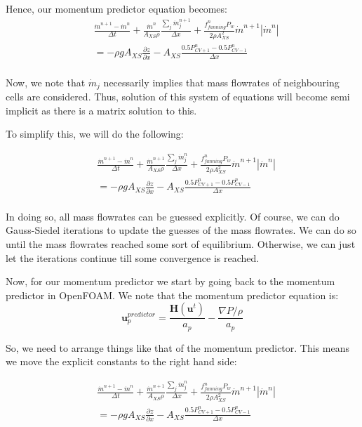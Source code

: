 \documentclass[masters]{ucbthesis}
\renewcommand{\_}{\kern-1.5pt\textunderscore\kern-1.5pt}
\begin{document}
Hence, our momentum predictor equation becomes:
\begin{align*} 
	& \frac{\dot{m}^{n+1} - \dot{m}^n}{\Delta t}
	+ \frac{\dot{m}^n}{A_{XS} \rho} \frac{\sum_j \dot{m}_j^{n+1}}{\Delta x} 
	+\frac{f_{fanning}^n P_w}{2 \rho A_{XS}^2} \dot{m}^{n+1} |\dot{m}^n| \\
	& =
	- \rho g A_{XS} \frac{\partial z}{\partial x}
	- A_{XS} \frac{0.5 P^{n}_{CV+1}-0.5P^n_{CV-1}}{\Delta x} \\
\end{align*}

Now, we note that $\dot{m}_j$ necessarily implies that mass flowrates 
of neighbouring cells are considered. Thus, solution of this system 
of equations will become semi implicit as there is a matrix solution to 
this.

To simplify this, we will do the following:

\begin{align*}
	& \frac{\dot{m}^{n+1} - \dot{m}^n}{\Delta t}
	+ \frac{\dot{m}^{n+1}}{A_{XS} \rho} \frac{\sum_j \dot{m}_j^{n}}{\Delta x} 
	+\frac{f_{fanning}^n P_w}{2 \rho A_{XS}^2} \dot{m}^{n+1} |\dot{m}^n|  \\ 
	&
	=
	- \rho g A_{XS} \frac{\partial z}{\partial x}
	- A_{XS} \frac{0.5 P^{n}_{CV+1}-0.5P^n_{CV-1}}{\Delta x} \\
\end{align*}


In doing so, all mass flowrates can be guessed explicitly. Of course, 
we can do Gauss-Siedel iterations to update the guesses of the mass flowrates.
We can do so until the mass flowrates reached some sort of equilibrium.
Otherwise, we can just let the iterations continue till some 
convergence is reached.

Now, for our momentum predictor we start by going back to the momentum 
predictor in OpenFOAM. We note that the momentum predictor equation is:
\begin{equation*}
	\textbf{u}_p^{predictor} = \frac{\textbf{H}(\textbf{u}^t)}{a_p}
	- \frac{\nabla P/\rho}{a_p}
\end{equation*}

So, we need to arrange things like that of the momentum predictor.
This means we move the explicit constants to the right hand side:

\begin{align*}
	& \frac{\dot{m}^{n+1} - \dot{m}^n}{\Delta t}
	+ \frac{\dot{m}^{n+1}}{A_{XS} \rho} \frac{\sum_j \dot{m}_j^{n}}{\Delta x} 
	+\frac{f_{fanning}^n P_w}{2 \rho A_{XS}^2} \dot{m}^{n+1} |\dot{m}^n|  \\ 
	&
	=
	- \rho g A_{XS} \frac{\partial z}{\partial x}
	- A_{XS} \frac{0.5 P^{n}_{CV+1}-0.5P^n_{CV-1}}{\Delta x} \\
\end{align*}
\end{document}
